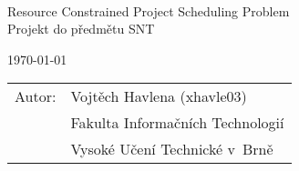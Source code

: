 %
%

\begin{titlepage}

\vfill~

\begin{center}
  \bigskip
  {\Huge Resource Constrained Project Scheduling Problem\\}
  {\Large Projekt do předmětu SNT\\}
\end{center}

\vfill

\begin{center}
  {\Large \today }
\end{center}

\vfill

\begin{flushleft}
  {\large 
  \begin{tabular}{ll}
    Autor: & Vojtěch Havlena (xhavle03) \\
    & Fakulta Informačních Technologií \\
    & Vysoké Učení Technické v~Brně \\
    \end{tabular} }
\end{flushleft}
\end{titlepage}
